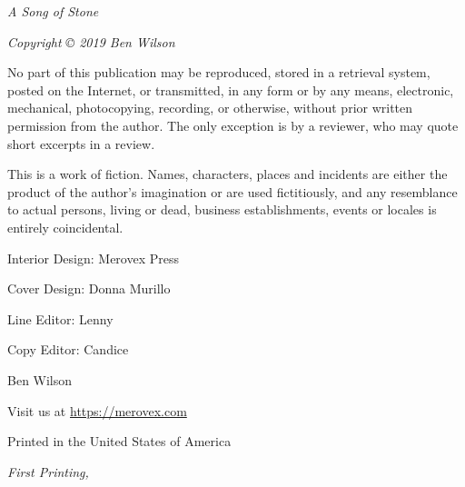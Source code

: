 \documentclass[11pt,]{book}
\begin{document}
  \pagestyle{empty}
    \vspace*{\fill}

    \par\noindent\emph{A Song of Stone}\newline
    \par\noindent\emph{Copyright © 2019 Ben Wilson}\newline

    \par\noindent No part of this publication may be reproduced, stored in a retrieval
system, posted on the Internet, or transmitted, in any form or by any
means, electronic, mechanical, photocopying, recording, or otherwise,
without prior written permission from the author. The only exception is
by a reviewer, who may quote short excerpts in a review.\newline

    \par\noindent This is a work of fiction. Names, characters, places and incidents are
either the product of the author's imagination or are used fictitiously,
and any resemblance to actual persons, living or dead, business
establishments, events or locales is entirely coincidental.\newline

    \par\noindent Interior Design: Merovex Press %
        \par\noindent Cover Design: Donna Murillo
        \par\noindent Line Editor: Lenny
        \par\noindent Copy Editor: Candice
    \newline

    \par\noindent Ben Wilson
        \par\noindent Visit us at \url{https://merovex.com}\newline
    
    \par\noindent Printed in the United States of America
    \newline

      \par\noindent\textit{First Printing, \usmonthyear{}}
      \newline
    
\end{document}
